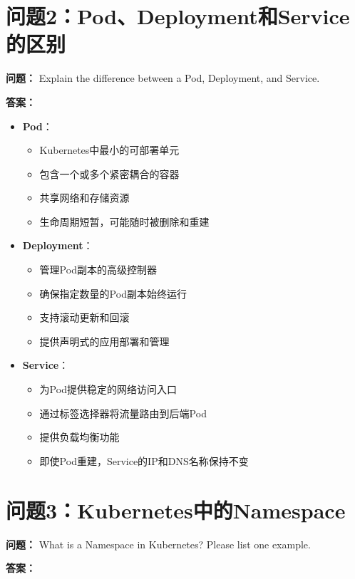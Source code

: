 \documentclass[12pt,a4paper]{article}
\begin{document}
\section{问题2：Pod、Deployment和Service的区别}

\textbf{问题：} Explain the difference between a Pod, Deployment, and Service.

\textbf{答案：}

\begin{itemize}
    \item \textbf{Pod}：
    \begin{itemize}
        \item Kubernetes中最小的可部署单元
        \item 包含一个或多个紧密耦合的容器
        \item 共享网络和存储资源
        \item 生命周期短暂，可能随时被删除和重建
    \end{itemize}
    
    \item \textbf{Deployment}：
    \begin{itemize}
        \item 管理Pod副本的高级控制器
        \item 确保指定数量的Pod副本始终运行
        \item 支持滚动更新和回滚
        \item 提供声明式的应用部署和管理
    \end{itemize}
    
    \item \textbf{Service}：
    \begin{itemize}
        \item 为Pod提供稳定的网络访问入口
        \item 通过标签选择器将流量路由到后端Pod
        \item 提供负载均衡功能
        \item 即使Pod重建，Service的IP和DNS名称保持不变
    \end{itemize}
\end{itemize}

\section{问题3：Kubernetes中的Namespace}

\textbf{问题：} What is a Namespace in Kubernetes? Please list one example.

\textbf{答案：}
\end{document}
